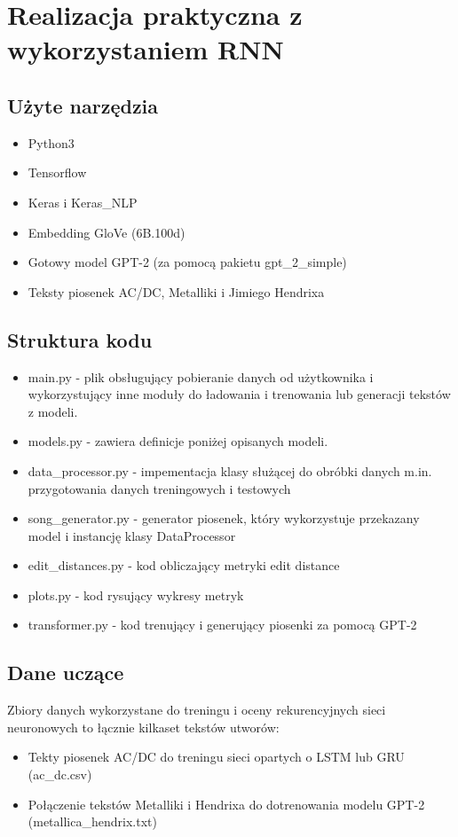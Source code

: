 \documentclass{article}
\begin{document}
\section{Realizacja praktyczna z wykorzystaniem RNN}
\subsection{Użyte narzędzia}
\begin{itemize}
	\item Python3
	\item Tensorflow
	\item Keras i Keras\_NLP
	\item Embedding GloVe (6B.100d)
	\item Gotowy model GPT-2 (za pomocą pakietu gpt\_2\_simple)
	\item Teksty piosenek AC/DC, Metalliki i Jimiego Hendrixa
\end{itemize}
\subsection{Struktura kodu}
\begin{itemize}
	\item main.py - plik obsługujący pobieranie danych od użytkownika i wykorzystujący inne moduły do ładowania i trenowania lub generacji tekstów z modeli.
	\item models.py - zawiera definicje poniżej opisanych modeli.
	\item data\_processor.py - impementacja klasy służącej do obróbki danych m.in. przygotowania danych treningowych i testowych
	\item song\_generator.py - generator piosenek, który wykorzystuje przekazany model i instancję klasy DataProcessor
	\item edit\_distances.py - kod obliczający metryki edit distance
	\item plots.py - kod rysujący wykresy metryk
	\item transformer.py - kod trenujący i generujący piosenki za pomocą GPT-2
\end{itemize}
\subsection{Dane uczące}
Zbiory danych wykorzystane do treningu i oceny rekurencyjnych sieci neuronowych to łącznie kilkaset tekstów utworów:
\begin{itemize}
	\item Tekty piosenek AC/DC do treningu sieci opartych o LSTM lub GRU (ac\_dc.csv)
	\item Połączenie tekstów Metalliki i Hendrixa do dotrenowania modelu GPT-2 (metallica\_hendrix.txt)
\end{itemize}
\newpage
\end{document}
